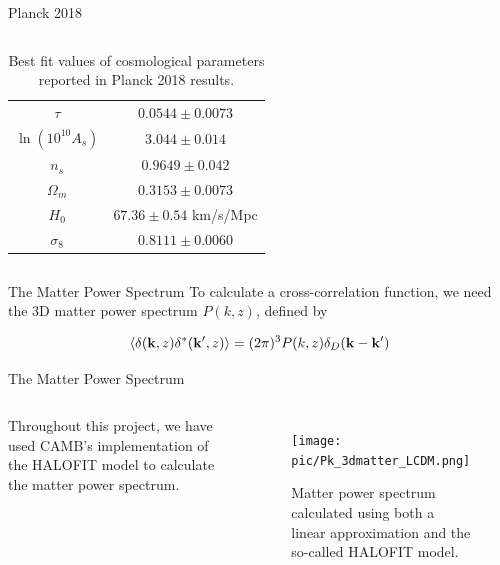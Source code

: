 \documentclass[serif, aspectratio=169]{beamer}
\begin{document}
\begin{frame}{Planck 2018}
\begin{columns}
\begin{table}[!htb]
\begin{tabular}{cc}
     $\tau$ & $0.0544\pm 0.0073$\\ 
     $\ln{(10^{10}A_s)}$ & $3.044 \pm 0.014$ \\ 
     $n_s$ & $0.9649 \pm 0.042$ \\ \hline
     $\Omega_m$ & $0.3153 \pm 0.0073$ \\
     $H_0$ & $67.36 \pm 0.54$ km/s/Mpc \\
     $\sigma_8$ & $0.8111 \pm 0.0060$ \\ \hline
    \end{tabular}
    \caption{Best fit values of cosmological parameters reported in Planck 2018 results.}
    \label{tab:planck_parameters}
\end{table}
    \end{columns}
\end{frame}

\begin{frame}{The Matter Power Spectrum}
    To calculate a cross-correlation function, we need the 3D matter power spectrum $P(k,z)$, defined by

    \begin{equation}
        \left\langle \delta(\mathbf{k},z) \delta^*(\mathbf{k}',z) \right\rangle=(2\pi)^3 P(k,z)\delta_D(\mathbf{k}-\mathbf{k}')
    \end{equation}
\end{frame}

\begin{frame}{The Matter Power Spectrum}
    \begin{columns}
        Throughout this project, we have used CAMB's implementation of the HALOFIT model to calculate the matter power spectrum.
        
    \begin{figure}
        \centering
        \texttt{[image: pic/Pk\_3dmatter\_LCDM.png]}
        \caption{Matter power spectrum calculated using both a linear approximation and the so-called HALOFIT model.}
        \label{fig:Pk3dmatter}
    \end{figure}
\end{columns}
\end{frame}
\end{document}
